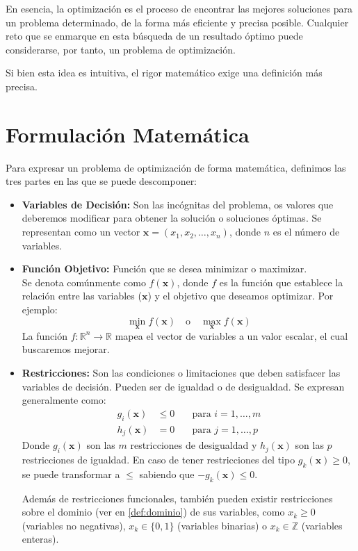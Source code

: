 \documentclass[12pt,a4paper]{book}
\begin{document}
En esencia, la optimización es el proceso de encontrar las mejores soluciones para un problema determinado, de la forma más eficiente y precisa posible.
Cualquier reto que se enmarque en esta búsqueda de un resultado óptimo puede considerarse, por tanto, un problema de optimización.

Si bien esta idea es intuitiva, el rigor matemático exige una definición más precisa.

\section{Formulación Matemática}

Para expresar un problema de optimización de forma matemática, definimos las tres partes en las que se puede descomponer:

\begin{itemize}
    \item \textbf{Variables de Decisión:} Son las incógnitas del problema, os valores que deberemos modificar para obtener la solución o soluciones óptimas. Se representan como un vector $\mathbf{x} = (x_1, x_2, \ldots, x_n)$, donde $n$ es el número de variables.

    \item \textbf{Función Objetivo:} Función que se desea minimizar o maximizar.\\
    Se denota comúnmente como $f(\mathbf{x})$, donde $f$ es la función que establece la relación entre las variables ($\mathbf{x}$) y el objetivo que deseamos optimizar.
    Por ejemplo:
    $$ \min_{\mathbf{x}} f(\mathbf{x}) \quad \text{o} \quad \max_{\mathbf{x}} f(\mathbf{x}) $$
    La función $f: \mathbb{R}^n \to \mathbb{R}$ mapea el vector de variables a un valor escalar, el cual buscaremos mejorar.

    \item \textbf{Restricciones:} Son las condiciones o limitaciones que deben satisfacer las variables de decisión. Pueden ser de igualdad o de desigualdad. Se expresan generalmente como:
    \begin{align*}
        g_i(\mathbf{x}) &\le 0 & \quad \text{para } i = 1, \ldots, m \\
        h_j(\mathbf{x}) &= 0 & \quad \text{para } j = 1, \ldots, p
    \end{align*}
    Donde $g_i(\mathbf{x})$ son las $m$ restricciones de desigualdad y $h_j(\mathbf{x})$ son las $p$ restricciones de igualdad.
    En caso de tener restricciones del tipo $g_k(\mathbf{x})\geq0$, se puede transformar a $\leq$ sabiendo que $-g_k(\mathbf{x}) \leq 0$.
    
    Además de restricciones funcionales, también pueden existir restricciones sobre el dominio (ver en \ref{def:dominio}) de sus variables, como $x_k \ge 0$ (variables no negativas),  $x_k \in \{0,1\}$ (variables binarias) o $x_k \in \mathbb{Z}$ (variables enteras).
\end{itemize}
\end{document}

